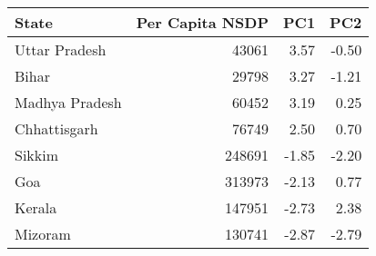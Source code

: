
\begin{tabular}{lrrr}
\toprule
State & Per Capita NSDP & PC1 & PC2\\
\midrule
Uttar Pradesh & 43061 & 3.57 & -0.50\\
Bihar & 29798 & 3.27 & -1.21\\
Madhya Pradesh & 60452 & 3.19 & 0.25\\
Chhattisgarh & 76749 & 2.50 & 0.70\\
Sikkim & 248691 & -1.85 & -2.20\\
\addlinespace
Goa & 313973 & -2.13 & 0.77\\
Kerala & 147951 & -2.73 & 2.38\\
Mizoram & 130741 & -2.87 & -2.79\\
\bottomrule
\end{tabular}

